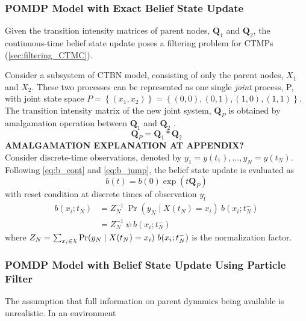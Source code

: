 \subsubsection{POMDP Model with Exact Belief State Update}
Given the transition intensity matrices of parent nodes, $ \textbf{Q}_1 $ and $ \textbf{Q}_2 $, the continuous-time belief state update poses a filtering problem for CTMPs (\autoref{sec:filtering_CTMC}). 

Consider a subsystem of CTBN model, consisting of only the parent nodes, $ X_1 $ and $ X_2 $. These two processes can be represented as one single \textit{joint} process, P, with joint state space $ \textit{P} = \left\lbrace (x_1, x_2)\right\rbrace  = \left\lbrace (0,0), (0,1), (1,0), (1,1)\right\rbrace  $. The transition intensity matrix of the new joint system, $ \textbf{Q}_P $ is obtained by amalgamation operation between $ \textbf{Q}_{1} $ and  $ \textbf{Q}_{2} $ \cite{Nodelman1995}.
\begin{equation}
\textbf{Q}_P = \textbf{Q}_{1} * \textbf{Q}_{2}
\end{equation}
\textbf{AMALGAMATION EXPLANATION AT APPENDIX?}\\
Consider discrete-time observations, denoted by $ y_{1}=y(t_{1}), ..., y_{N}=y(t_{N}) $. Following \autoref{eq:b_cont} and \autoref{eq:b_jump}, the belief state update is evaluated as
\begin{equation}
b(t) = b(0) \exp(t\textbf{Q}_P)
\end{equation}
with reset condition at discrete times of observation $ y_{t} $ 
\begin{align}
b(x_{i}; t_{N}) &= Z_{N}^{-1}\ {\operatorname{Pr}(y_{N} \mid X(t_{N})=x_{i})}\ {b(x_{i}; t_{N}^{-})} \\ & = Z_{N}^{-1}\ \psi \ {b(x_{i}; t_{N}^{-})}
\end{align}
where $ Z_{N} = \sum_{x_{i}\in \rchi} \operatorname{Pr}(y_{N} \mid X(t_{N})=x_{i})\ b(x_{i}; t_{N}^{-}) $ is the normalization factor.

\subsubsection{POMDP Model with Belief State Update Using Particle Filter}

The assumption that full information on parent dynamics being available is unrealistic. In an environment 

